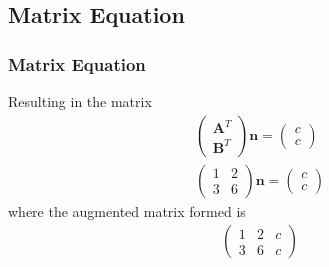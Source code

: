 \documentclass{beamer}
\theoremstyle{remark}
\newcommand{\myvec}[1]{\ensuremath{\begin{pmatrix}#1\end{pmatrix}}}
\let\vec\mathbf
\numberwithin{equation}{section}
\begin{document}
\subsection{Matrix Equation}
\begin{frame}
\frametitle{Matrix Equation}


Resulting in the matrix
\begin{align}
\label{eq:matrix}
\myvec{\vec{A}^T \\ \vec{B}^T} \vec{n}=\myvec{c \\ c} \\
 \myvec{1 &2 \\ 3&6} \vec{n}=\myvec{c\\c}
\end{align}
where the augmented matrix formed is
\begin{align}
    \myvec{1&2&c\\3&6&c} \label{eq:m1}
\end{align}
\end{frame}
\end{document}
